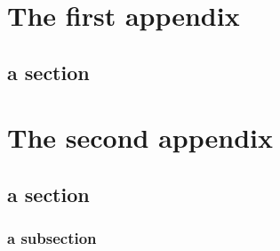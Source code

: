 \chapter{The first appendix}
\section{a section}

\chapter{The second appendix}
\section{a section}
\subsection{a subsection}
